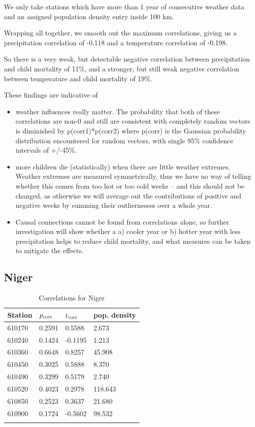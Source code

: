 \documentclass[
10pt, %
a4paper, %
oneside, %
headinclude,footinclude, %
useAMS,
usenatbib
]{mn2e}  %
\begin{document}
We only take stations which have more than 1 year of consecutive weather data and an assigned population density entry inside 100 km.

Wrapping all together, we smooth out the maximum correlations, giving us a precipitation correlation of -0.118 and a temperature correlation of -0.198.

So there is a very weak, but detectable negative correlation between precipitation and child mortality of 11\%, and a stronger, but still weak negative correlation between temperature and child mortality of 19\%.

These findings are indicative of
\begin{itemize}
\item weather influences really matter. The probability that both of these
  correlations are non-0 and still are consistent with completely
  random vectors is diminished by p(corr1)*p(corr2) where p(corr) is
  the Gaussian probability distribution encountered for random
  vectors, with single 95\% confidence intervals of +/-45\%.
\item more children die (statistically) when there are little weather
  extremes. Weather extremes are measured symmetrically, thus we have
  no way of telling whether this comes from too hot or too cold weeks
  -- and this should not be changed, as otherwise we will average out the
  contributions of positive and negative weeks by summing their
  outliernesses over a whole year.
\item Causal connections cannot be found from correlations alone, so
  further investigation will show whether a a) cooler year or b)
  hotter year with less precipitation helps to reduce child mortality,
  and what measures can be taken to mitigate the effects.
\end{itemize}

\subsection{Niger}
\begin{table}
    \caption{Correlations for Niger}
    \begin{tabular}{ l l l l }
        \hline\hline
        Station & $p_{\rm corr}$ & $t_{\rm corr}$ & pop. density\\
        \hline
        610170 & 0.2591 &  0.5588 &  2.673 \\
        610240 & 0.1424 & -0.1195 &  1.213 \\
        610360 & 0.6648 &  0.8257 & 45.908 \\
        610450 & 0.3025 &  0.5888 &  8.370 \\
        610490 & 0.3299 &  0.5179 &  2.740 \\
        610520 & 0.4023 &  0.2978 &118.643 \\
        610850 & 0.2523 &  0.3637 & 21.680 \\
        610900 & 0.1724 & -0.5602 & 98.532 \\
        \hline
        \label{tab:NR}
    \end{tabular}
\end{table}
\end{document}
